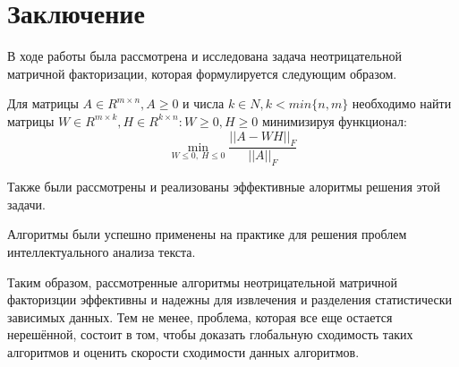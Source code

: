 
\chapter*{Заключение}

В ходе работы была рассмотрена и исследована задача неотрицательной матричной факторизации, которая формулируется следующим образом.

Для матрицы $A \in R^{m \times n}, A \geq 0$ и числа $k \in N, k < min\{n, m\}$
необходимо найти матрицы $W \in R^{m \times k}, H \in R^{k \times n} : W \geq 0, H \geq 0$ минимизируя функционал:
\begin{equation*} \label{eq:min_problem}
  \min_{W \leq 0, \ H \leq 0} \dfrac{||A - WH||_F}{|| A ||_F}
\end{equation*}

Также были рассмотрены и реализованы эффективные алоритмы решения этой задачи.

Алгоритмы были успешно применены на практике для решения проблем интеллектуального анализа текста.

Таким образом, рассмотренные алгоритмы неотрицательной матричной факторизции
эффективны и надежны для извлечения и разделения статистически зависимых данных.
Тем не менее, проблема, которая все еще остается нерешённой, состоит в том,
чтобы доказать глобальную сходимость таких алгоритмов и оценить скорости сходимости данных алгоритмов.
